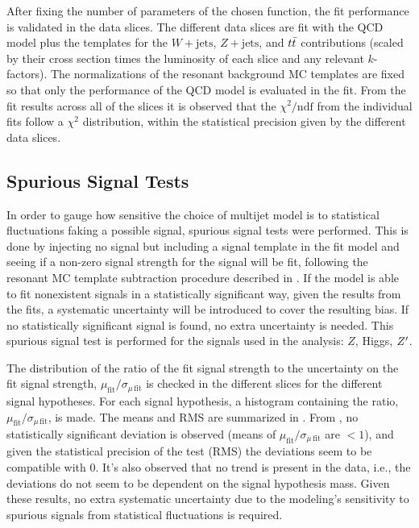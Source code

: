 After fixing the number of parameters of the chosen function, the fit performance is  validated in the \CRQCD{} data slices.
The different \CRQCD{} data slices are fit with the QCD model plus the templates for the $W+\mathrm{jets}$, $Z+\mathrm{jets}$, and $t\bar{t}$ contributions (scaled by their cross section times the luminosity of each slice and any relevant $k$-factors).
The normalizations of the resonant background MC templates are fixed so that only the performance of the QCD model is evaluated in the fit.
From the fit results across all of the \CRQCD{} slices it is observed that the $\chi^{2}/\mathrm{ndf}$ from the individual fits follow a $\chi^{2}$ distribution, within the statistical precision given by the different data slices.

\subsection{Spurious Signal Tests}

In order to gauge how sensitive the choice of multijet model is to statistical fluctuations faking a possible signal, spurious signal tests were performed.
This is done by injecting no signal but including a signal template in the fit model and seeing if a non-zero signal strength for the signal will be fit, following the resonant MC template subtraction procedure described in .
If the model is able to fit nonexistent signals in a statistically significant way, given the results from the \CRQCD{} fits, a systematic uncertainty will be introduced to cover the resulting bias.
If no statistically significant signal is found, no extra uncertainty is needed.
This spurious signal test is performed for the signals used in the analysis: $Z$, Higgs, $Z'$.

The distribution of the ratio of the fit signal strength to the uncertainty on the fit signal strength, $\mu_{\mathrm{fit}}/\sigma_{\mu\,\mathrm{fit}}$ is checked in the different \CRQCD{} slices for the different signal hypotheses.
For each signal hypothesis, a histogram containing the ratio, $\mu_{\mathrm{fit}}/\sigma_{\mu\,\mathrm{fit}}$, is made.
The means and RMS are summarized in .
From , no statistically significant deviation is observed (means of $\mu_{\mathrm{fit}}/\sigma_{\mu\,\mathrm{fit}}$ are $<1$), and given the statistical precision of the test (RMS) the deviations seem to be compatible with $0$.
It's also observed that no trend is present in the data, i.e., the deviations do not seem to be dependent on the signal hypothesis mass.
Given these results, no extra systematic uncertainty due to the modeling’s sensitivity to spurious signals from statistical fluctuations is required.

